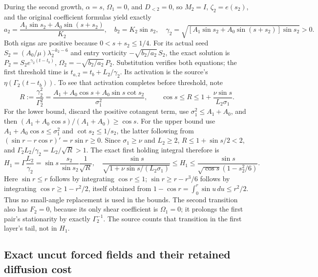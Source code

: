 During the second growth, $\alpha=s$, $\Omega_1=0$, and
$D_{<2}=0$, so $M_2=I$, $\zeta_2=e(s_2)$, and the original
coefficient formulas yield exactly
\begin{equation}
 a_2=\frac{A_1\sin s_2+A_0\sin(s+s_2)}{K_2},\quad
 b_2=K_2\sin s_2,\quad
 \gamma_2=\sqrt{[A_1\sin s_2+A_0\sin(s+s_2)]\sin s_2}>0.
 \label{cvlane:eq:cv-first-second-growth}
\end{equation}
Both signs are positive because $0<s+s_2\leq1/4$.
For its actual seed $S_2=(A_0/\mu)\lambda_2^{-k_2-6}$ and
entry vorticity $-\sqrt{b_2/a_2}\,S_2$, the exact solution is
$P_2=S_2e^{\gamma_2(t-t_b)}$,
$\Omega_2=-\sqrt{b_2/a_2}\,P_2$.
Substitution verifies both equations; the first threshold time is
$t_{a,2}=t_b+L_2/\gamma_2$.
Its activation is the source's $\eta(\Gamma_2(t-t_b))$.
To see that activation completes before threshold, note
\begin{equation}
 R:=\frac{\gamma_2^2}{\Gamma_2^2}
  =\frac{A_1+A_0\cos s+A_0\sin s\cot s_2}{\sigma_1^2},
 \qquad
 \cos s\leq R\leq1+\frac{\nu\sin s}{L_2\sigma_1}.
 \label{cvlane:eq:cv-first-rate-ratio}
\end{equation}
For the lower bound, discard the positive cotangent term, use
$\sigma_1^2\leq A_1+A_0$, and then
$(A_1+A_0\cos s)/(A_1+A_0)\geq\cos s$.
For the upper bound use $A_1+A_0\cos s\leq\sigma_1^2$ and
$\cot s_2\leq1/s_2$, the latter following from
$(\sin r-r\cos r)'=r\sin r\geq0$.
Since $\sigma_1\geq\nu$ and $L_2\geq2$,
$R\leq1+\sin s/2<2$, and
$\Gamma_2L_2/\gamma_2=L_2/\sqrt R>1$.
The exact first holding integral therefore is
\begin{equation}
 H_1=\Gamma\frac{L_2}{\gamma_2}
     =\sin s\,\frac{s_2}{\sin s_2}\frac1{\sqrt R},\quad
 \frac{\sin s}{\sqrt{1+\nu\sin s/(L_2\sigma_1)}}
 \leq H_1\leq
 \frac{\sin s}{\sqrt{\cos s}(1-s_2^2/6)}.
 \label{cvlane:eq:cv-first-exact-holding-cost}
\end{equation}
Here $\sin r\leq r$ follows by integrating $\cos r\leq1$;
$\sin r\geq r-r^3/6$ follows by integrating
$\cos r\geq1-r^2/2$, itself obtained from
$1-\cos r=\int_0^r\sin u\,du\leq r^2/2$.
Thus no small-angle replacement is used in the bounds.
The second transition also has $F_2=0$, because its only shear
coefficient is $\Omega_1=0$; it prolongs the first pair's stationarity
by exactly $\Gamma_2^{-1}$. The source counts that transition in
the first layer's tail, not in $H_1$.

\subsection{Exact uncut forced fields and their retained diffusion cost}

